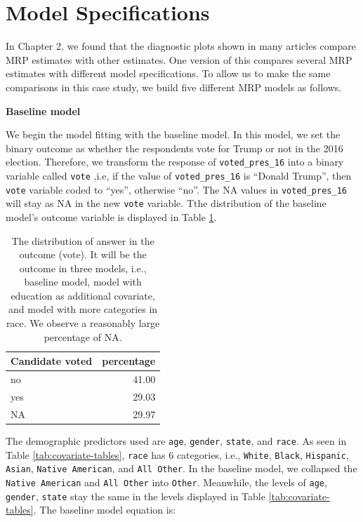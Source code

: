 \documentclass{monashthesis}
\begin{document}
\hypertarget{spec}{%
\section{Model Specifications}\label{spec}}

In Chapter 2, we found that the diagnostic plots shown in many articles compare MRP estimates with other estimates. One version of this compares several MRP estimates with different model specifications. To allow us to make the same comparisons in this case study, we build five different MRP models as follows.

\textbf{Baseline model}

We begin the model fitting with the baseline model. In this model, we set the binary outcome as whether the respondents vote for Trump or not in the 2016 election. Therefore, we transform the response of \texttt{voted\_pres\_16} into a binary variable called \texttt{vote} ,i.e, if the value of \texttt{voted\_pres\_16} is ``Donald Trump'', then \texttt{vote} variable coded to ``yes'', otherwise ``no''. The NA values in \texttt{voted\_pres\_16} will stay as NA in the new \texttt{vote} variable. Tthe distribution of the baseline model's outcome variable is displayed in Table \ref{tab:vote-dist}.

\begin{table}

\caption{\label{tab:vote-dist}The distribution of answer in the outcome (vote). It will be the outcome in three models, i.e., baseline model, model with education as additional covariate, and model with more categories in race. We observe a reasonably large percentage of NA.}
\centering
\begin{tabular}[t]{lr}
\toprule
Candidate voted & percentage\\
\midrule
no & 41.00\\
yes & 29.03\\
NA & 29.97\\
\bottomrule
\end{tabular}
\end{table}

The demographic predictors used are \texttt{age}, \texttt{gender}, \texttt{state}, and \texttt{race}. As seen in Table \ref{tab:covariate-tables}, \texttt{race} has 6 categories, i.e., \texttt{White}, \texttt{Black}, \texttt{Hispanic}, \texttt{Asian}, \texttt{Native\ American}, and \texttt{All\ Other}. In the baseline model, we collapsed the \texttt{Native\ American} and \texttt{All\ Other} into \texttt{Other}. Meanwhile, the levels of \texttt{age}, \texttt{gender}, \texttt{state} stay the same in the levels displayed in Table \ref{tab:covariate-tables}. The baseline model equation is:
\end{document}

